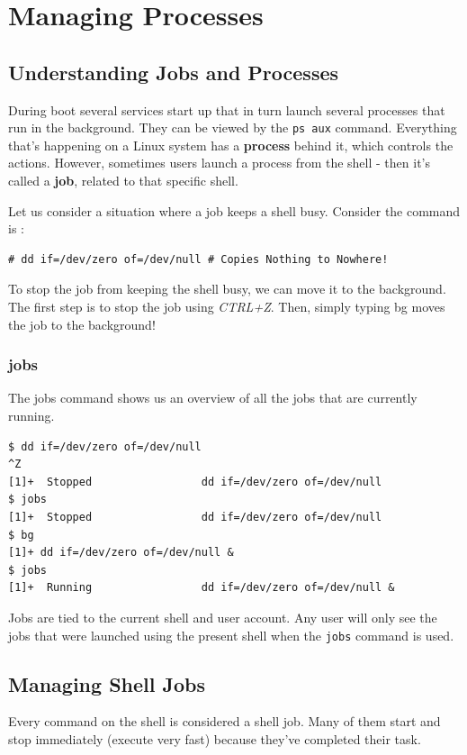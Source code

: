 \chapter{Managing Processes}
\section{Understanding Jobs and Processes}
During boot several services start up that in turn launch several processes that run in the background. They can be viewed by the \verb|ps aux| command. Everything that's happening on a Linux system has a \textbf{process} behind it, which controls the actions. However, sometimes users launch a process from the shell - then it's called a \textbf{job}, related to that specific shell. 

Let us consider a situation where a job keeps a shell busy. Consider the command is :

\vspace{-15pt}
\begin{verbatim}
# dd if=/dev/zero of=/dev/null # Copies Nothing to Nowhere!
\end{verbatim}
\vspace{-10pt}

To stop the job from keeping the shell busy, we can move it to the background. The first step is to stop the job using \textit{CTRL+Z}. Then, simply typing bg moves the job to the background!

\subsection{jobs}
The jobs command shows us an overview of all the jobs that are currently running. 

\vspace{-15pt}
\begin{verbatim}
$ dd if=/dev/zero of=/dev/null
^Z
[1]+  Stopped                 dd if=/dev/zero of=/dev/null
$ jobs
[1]+  Stopped                 dd if=/dev/zero of=/dev/null
$ bg
[1]+ dd if=/dev/zero of=/dev/null &
$ jobs
[1]+  Running                 dd if=/dev/zero of=/dev/null &
\end{verbatim}
\vspace{-10pt}

\noindent
Jobs are tied to the current shell and user account. Any user will only see the jobs that were launched using the present shell when the \verb|jobs| command is used.

	\section{Managing Shell Jobs} 
Every command on the shell is considered a shell job. Many of them start and stop immediately (execute very fast) because they've completed their task. 

